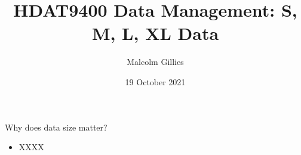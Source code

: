 \documentclass[aspectratio=169,12pt,usepdftitle=false]{beamer} %
\title{HDAT9400 Data Management: S, M, L, XL Data}
\institute{\url{https://github.com/mbg-unsw/hdat9400}}
\author{Malcolm Gillies}
\date{19 October 2021}
\begin{document}
{
\begin{frame}
\titlepage
\end{frame}
}


\begin{frame}{Why does data size matter?}
    \begin{itemize}
        \item XXXX
    \end{itemize}
\end{frame}

%
%

%
%
%
%
%
%
%


\end{document}
